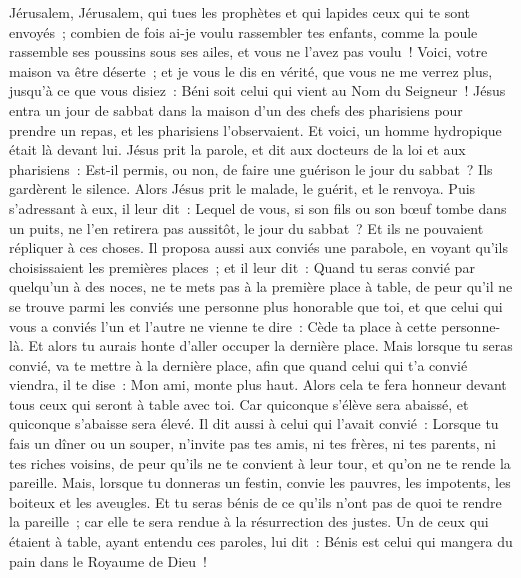 \begin{multicols}{2}
Jérusalem, Jérusalem, qui tues les prophètes et qui lapides ceux qui te sont envoyés~; combien de fois ai-je voulu rassembler tes enfants, comme la poule rassemble ses poussins sous ses ailes, et vous ne l'avez pas voulu~!
Voici, votre maison va être déserte~; et je vous le dis en vérité, que vous ne me verrez plus, jusqu'à ce que vous disiez~: Béni soit celui qui vient au Nom du Seigneur~!
\VerseOne{}Jésus entra un jour de sabbat dans la maison d'un des chefs des pharisiens pour prendre un repas, et les pharisiens l'observaient.
Et voici, un homme hydropique était là devant lui.
Jésus prit la parole, et dit aux docteurs de la loi et aux pharisiens~: Est-il permis, ou non, de faire une guérison le jour du sabbat~?
Ils gardèrent le silence. Alors Jésus prit le malade, le guérit, et le renvoya.
Puis s'adressant à eux, il leur dit~: Lequel de vous, si son fils ou son bœuf tombe dans un puits, ne l'en retirera pas aussitôt, le jour du sabbat~?
Et ils ne pouvaient répliquer à ces choses.
Il proposa aussi aux conviés une parabole, en voyant qu'ils choisissaient les premières places~; et il leur dit~:
Quand tu seras convié par quelqu'un à des noces, ne te mets pas à la première place à table, de peur qu'il ne se trouve parmi les conviés une personne plus honorable que toi,
et que celui qui vous a conviés l'un et l'autre ne vienne te dire~: Cède ta place à cette personne-là. Et alors tu aurais honte d'aller occuper la dernière place.
Mais lorsque tu seras convié, va te mettre à la dernière place, afin que quand celui qui t'a convié viendra, il te dise~: Mon ami, monte plus haut. Alors cela te fera honneur devant tous ceux qui seront à table avec toi.
Car quiconque s'élève sera abaissé, et quiconque s'abaisse sera élevé.
Il dit aussi à celui qui l'avait convié~: Lorsque tu fais un dîner ou un souper, n'invite pas tes amis, ni tes frères, ni tes parents, ni tes riches voisins, de peur qu'ils ne te convient à leur tour, et qu'on ne te rende la pareille.
Mais, lorsque tu donneras un festin, convie les pauvres, les impotents, les boiteux et les aveugles.
Et tu seras bénis de ce qu'ils n'ont pas de quoi te rendre la pareille~; car elle te sera rendue à la résurrection des justes.
Un de ceux qui étaient à table, ayant entendu ces paroles, lui dit~: Bénis est celui qui mangera du pain dans le Royaume de Dieu~!

\end{multicols}
